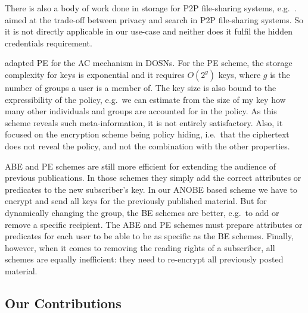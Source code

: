 There is also a body of work done in storage for \ac{P2P} file-sharing systems, 
e.g.\ \cite{TunableACinP2P}.
\citet{TunableACinP2P} aimed at the trade-off between privacy and search in 
\ac{P2P} file-sharing systems.
So it is not directly applicable in our use-case and neither does it fulfil the 
hidden credentials requirement.


\citet{PEAC} adapted \ac{PE} for the \ac{AC} mechanism in \acp{DOSN}.
For the \ac{PE} scheme, the storage complexity for keys is exponential and it 
requires \(O(2^g)\) keys, where \(g\) is the number of groups a user is 
a member of.
The key size is also bound to the expressibility of the policy, e.g.\ we can 
estimate from the size of my key how many other individuals and groups are 
accounted for in the policy.
As this scheme reveals such meta-information, it is not entirely satisfactory.
Also, it focused on the encryption scheme being policy hiding, i.e.\ that the 
ciphertext does not reveal the policy, and not the combination with the other 
properties.

\Ac{ABE} and \ac{PE} schemes are still more efficient for extending the 
audience of previous publications.
In those schemes they simply add the correct attributes or predicates to the 
new subscriber's key.
In our \ac{ANOBE} based scheme we have to encrypt and send all keys for the 
previously published material.
But for dynamically changing the group, the \ac{BE} schemes are better, e.g.\ 
to add or remove a specific recipient.
The \ac{ABE} and \ac{PE} schemes must prepare attributes or predicates for each 
user to be able to be as specific as the \ac{BE} schemes.
Finally, however, when it comes to removing the reading rights of a subscriber, 
all schemes are equally inefficient: they need to re-encrypt all previously 
posted material.

\subsection{Our Contributions}

